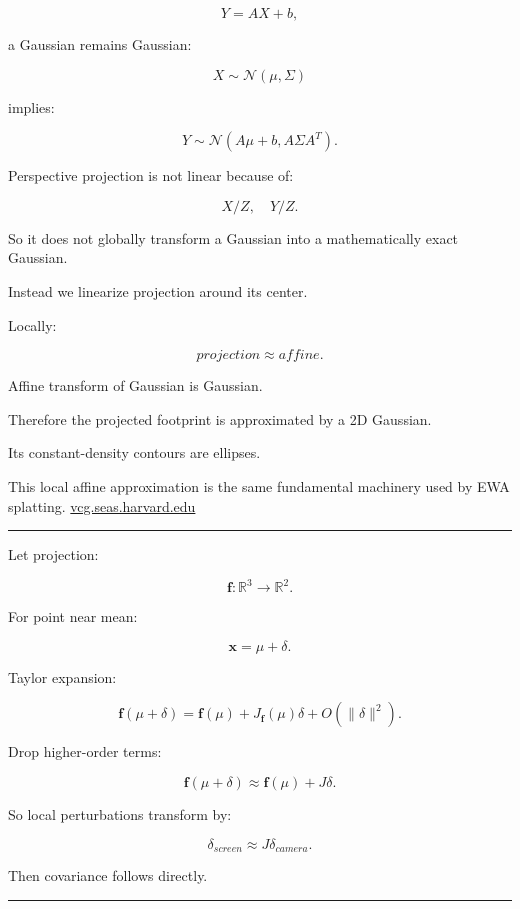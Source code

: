 \[
Y=AX+b,
\]

a Gaussian remains Gaussian:

\[
X\sim\mathcal N(\mu,\Sigma)
\]

implies:

\[
Y
\sim
\mathcal N(
A\mu+b,
A\Sigma A^T
).
\]

Perspective projection is not linear because of:

\[
X/Z,\quad Y/Z.
\]

So it does not globally transform a Gaussian into a mathematically exact Gaussian.

Instead we linearize projection around its center.

Locally:

\[
projection
\approx
affine.
\]

Affine transform of Gaussian is Gaussian.

Therefore the projected footprint is approximated by a 2D Gaussian.

Its constant-density contours are ellipses.

This local affine approximation is the same fundamental machinery used by EWA splatting. \href{https://vcg.seas.harvard.edu/content/3-publications/20010101-surface-splatting/p371-zwicker.pdf?utm_source=chatgpt.com}{vcg.seas.harvard.edu}

\begin{center}\rule{0.5\linewidth}{0.5pt}\end{center}

Let projection:

\[
\mathbf f:
\mathbb R^3
\rightarrow
\mathbb R^2.
\]

For point near mean:

\[
\mathbf x=
\mu+\delta.
\]

Taylor expansion:

\[
\mathbf f(\mu+\delta)
=
\mathbf f(\mu)
+
J_{\mathbf f}(\mu)\delta
+
O(\|\delta\|^2).
\]

Drop higher-order terms:

\[
\boxed{
\mathbf f(\mu+\delta)
\approx
\mathbf f(\mu)
+
J\delta.
}
\]

So local perturbations transform by:

\[
\delta_{screen}
\approx
J\delta_{camera}.
\]

Then covariance follows directly.

\begin{center}\rule{0.5\linewidth}{0.5pt}\end{center}

